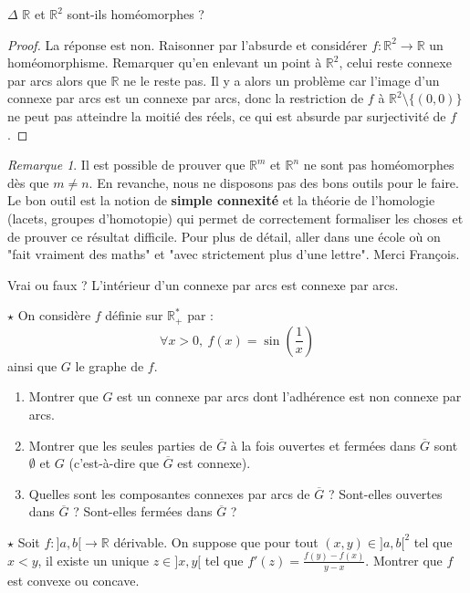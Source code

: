 \documentclass[french,a4paper]{article}
\newcommand{\R}{\mathbb{R}}
\newcommand{\st}{^*}
\theoremstyle{plain}
\theoremstyle{definition}
\theoremstyle{remark}
\newtheorem*{rmq}{Remarque}
\begin{document}
\begin{ex}{$\Delta$}
	$\R$ et $\R^2$ sont-ils homéomorphes ?
\end{ex}
\begin{proof}
	La réponse est non. Raisonner par l'absurde et considérer $f:\R^2\to\R$ un homéomorphisme. Remarquer qu'en enlevant un point à $\R^2$, celui reste connexe par arcs alors que $\R$ ne le reste pas. Il y a alors un problème car l'image d'un connexe par arcs est un connexe par arcs, donc la restriction de $f$ à $\R^2\setminus\{(0,0)\}$ ne peut pas atteindre la moitié des réels, ce qui est absurde par surjectivité de $f$.
\end{proof}
\begin{rmq}
	Il est possible de prouver que $\R^m$ et $\R^n$ ne sont pas homéomorphes dès que $m\ne n$. En revanche, nous ne disposons pas des bons outils pour le faire. Le bon outil est la notion de \textbf{simple connexité} et la théorie de l'homologie (lacets, groupes d'homotopie) qui permet de correctement formaliser les choses et de prouver ce résultat difficile. Pour plus de détail, aller dans une école où on "fait vraiment des maths" et "avec strictement plus d'une lettre". Merci François.
\end{rmq}

\begin{ex}{}
	Vrai ou faux ? L'intérieur d'un connexe par arcs est connexe par arcs.
\end{ex}

\begin{ex}{$\star$}
	On considère $f$ définie sur $\R_+\st$ par : $$\forall x>0,\ f(x)=\sin\left(\frac{1}{x}\right)$$ ainsi que $G$ le graphe de $f$.
	\begin{enumerate}
		\item Montrer que $G$ est un connexe par arcs dont l'adhérence est non connexe par arcs.
		\item Montrer que les seules parties de $\overline{G}$ à la fois ouvertes et fermées dans $\overline{G}$ sont $\emptyset$ et $G$ (c'est-à-dire que $\overline{G}$ est connexe).
		\item Quelles sont les composantes connexes par arcs de $\overline{G}$ ? Sont-elles ouvertes dans $\overline{G}$ ? Sont-elles fermées dans $\overline{G}$ ?
	\end{enumerate}
\end{ex}

\begin{ex}{$\star$}
	Soit $f:]a,b[\to\R$ dérivable. On suppose que pour tout $(x,y)\in]a,b[^2$ tel que $x<y$, il existe un unique $z\in]x,y[$ tel que $f'(z)=\displaystyle\frac{f(y)-f(x)}{y-x}$. Montrer que $f$ est convexe ou concave.
\end{ex}
\end{document}
